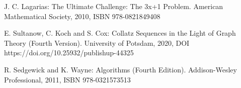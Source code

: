 \documentclass{SciPress_2015}
\begin{document}
\vspace{1em}
\begin{thebibliography}{99}

J. C. Lagarias: The Ultimate Challenge: The 3x+1 Problem. American Mathematical Society, 2010, ISBN 978-0821849408

E. Sultanow, C. Koch and S. Cox: Collatz Sequences in the Light of Graph Theory (Fourth Version). University of Potsdam, 2020, DOI https://doi.org/10.25932/publishup-44325

R. Sedgewick and K. Wayne: Algorithms (Fourth Edition). Addison-Wesley Professional, 2011, ISBN 978-0321573513

\end{thebibliography}
\end{document}
